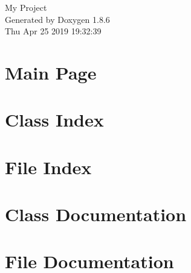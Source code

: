 \documentclass[twoside]{book}
\newcommand{\clearemptydoublepage}{%
  \newpage{\pagestyle{empty}\cleardoublepage}%
}
\begin{document}
\hypersetup{pageanchor=false}
\begin{titlepage}
\vspace*{7cm}
\begin{center}%
{\Large My Project }\\
\vspace*{1cm}
{\large Generated by Doxygen 1.8.6}\\
\vspace*{0.5cm}
{\small Thu Apr 25 2019 19:32:39}\\
\end{center}
\end{titlepage}
\clearemptydoublepage
\tableofcontents
\clearemptydoublepage
{}
\hypersetup{pageanchor=true}

\chapter{Main Page}
\label{index}\hypertarget{index}{}
\chapter{Class Index}

\chapter{File Index}

\chapter{Class Documentation}































\chapter{File Documentation}



\newpage
{}
{}
\printindex
\end{document}
